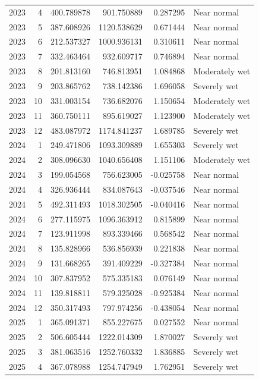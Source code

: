 \begin{tabular}{rrrrrl}
2023 & 4 & 400.789878 & 901.750889 & 0.287295 & Near normal \\
2023 & 5 & 387.608926 & 1120.538629 & 0.671444 & Near normal \\
2023 & 6 & 212.537327 & 1000.936131 & 0.310611 & Near normal \\
2023 & 7 & 332.463464 & 932.609717 & 0.746894 & Near normal \\
2023 & 8 & 201.813160 & 746.813951 & 1.084868 & Moderately wet \\
2023 & 9 & 203.865762 & 738.142386 & 1.696058 & Severely wet \\
2023 & 10 & 331.003154 & 736.682076 & 1.150654 & Moderately wet \\
2023 & 11 & 360.750111 & 895.619027 & 1.123900 & Moderately wet \\
2023 & 12 & 483.087972 & 1174.841237 & 1.689785 & Severely wet \\
2024 & 1 & 249.471806 & 1093.309889 & 1.655303 & Severely wet \\
2024 & 2 & 308.096630 & 1040.656408 & 1.151106 & Moderately wet \\
2024 & 3 & 199.054568 & 756.623005 & -0.025758 & Near normal \\
2024 & 4 & 326.936444 & 834.087643 & -0.037546 & Near normal \\
2024 & 5 & 492.311493 & 1018.302505 & -0.040416 & Near normal \\
2024 & 6 & 277.115975 & 1096.363912 & 0.815899 & Near normal \\
2024 & 7 & 123.911998 & 893.339466 & 0.568542 & Near normal \\
2024 & 8 & 135.828966 & 536.856939 & 0.221838 & Near normal \\
2024 & 9 & 131.668265 & 391.409229 & -0.327384 & Near normal \\
2024 & 10 & 307.837952 & 575.335183 & 0.076149 & Near normal \\
2024 & 11 & 139.818811 & 579.325028 & -0.925384 & Near normal \\
2024 & 12 & 350.317493 & 797.974256 & -0.438054 & Near normal \\
2025 & 1 & 365.091371 & 855.227675 & 0.027552 & Near normal \\
2025 & 2 & 506.605444 & 1222.014309 & 1.870027 & Severely wet \\
2025 & 3 & 381.063516 & 1252.760332 & 1.836885 & Severely wet \\
2025 & 4 & 367.078988 & 1254.747949 & 1.762951 & Severely wet \\

\end{tabular}
